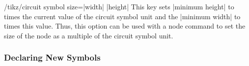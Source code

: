 \documentclass[a4paper]{ltxdoc}
\begin{document}
\begin{key}{/tikz/circuit symbol size=|width|  |height|
  }
 This key sets |minimum height| to  times the current
 value of the circuit symbol unit and the |minimum width| to
  times this value. Thus, this option can be used with a
 node command to set the size of the node as a multiple of the
 circuit symbol unit.

 \begin{codeexample}[]
 \end{codeexample}
\end{key}

\subsubsection{Declaring New Symbols}
\end{document}
